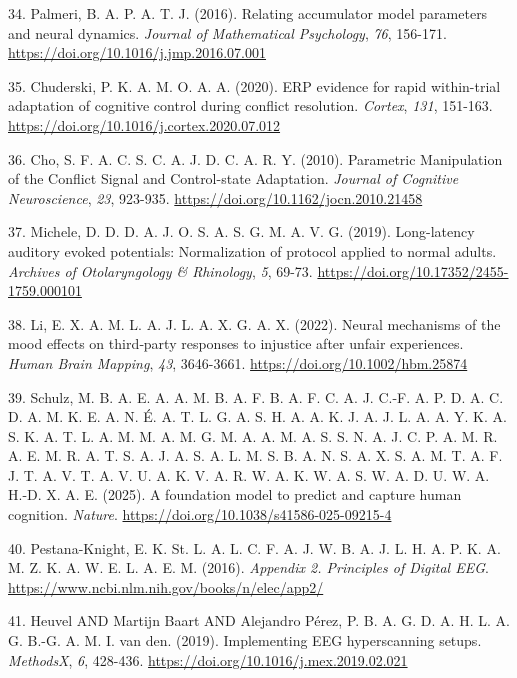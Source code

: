 \documentclass[
  spanish,
  10pt,
]{article}
\newlength{\cslhangindent}
\newenvironment{CSLReferences}[2] %
 {\begin{list}{}{%
  \setlength{\itemindent}{0pt}
  \setlength{\leftmargin}{0pt}
  \setlength{\parsep}{0pt}
  \ifodd #1
   \setlength{\leftmargin}{\cslhangindent}
   \setlength{\itemindent}{-1\cslhangindent}
  \fi
  \setlength{\itemsep}{#2\baselineskip}}}
 {\end{list}}
\begin{document}
\begin{CSLReferences}{1}{0}
34. Palmeri, B. A. P. A. T. J. (2016). Relating accumulator model
parameters and neural dynamics. \emph{Journal of Mathematical
Psychology}, \emph{76}, 156-171.
\url{https://doi.org/10.1016/j.jmp.2016.07.001}

35. Chuderski, P. K. A. M. O. A. A. (2020). ERP evidence for rapid
within-trial adaptation of cognitive control during conflict resolution.
\emph{Cortex}, \emph{131}, 151-163.
\url{https://doi.org/10.1016/j.cortex.2020.07.012}

36. Cho, S. F. A. C. S. C. A. J. D. C. A. R. Y. (2010). Parametric
Manipulation of the Conflict Signal and Control-state Adaptation.
\emph{Journal of Cognitive Neuroscience}, \emph{23}, 923-935.
\url{https://doi.org/10.1162/jocn.2010.21458}

37. Michele, D. D. D. A. J. O. S. A. S. G. M. A. V. G. (2019).
Long-latency auditory evoked potentials: Normalization of protocol
applied to normal adults. \emph{Archives of Otolaryngology \&
Rhinology}, \emph{5}, 69-73.
\url{https://doi.org/10.17352/2455-1759.000101}

38. Li, E. X. A. M. L. A. J. L. A. X. G. A. X. (2022). Neural mechanisms
of the mood effects on third‐party responses to injustice after unfair
experiences. \emph{Human Brain Mapping}, \emph{43}, 3646-3661.
\url{https://doi.org/10.1002/hbm.25874}

39. Schulz, M. B. A. E. A. A. M. B. A. F. B. A. F. C. A. J. C.-F. A. P.
D. A. C. D. A. M. K. E. A. N. É. A. T. L. G. A. S. H. A. A. K. J. A. J.
L. A. A. Y. K. A. S. K. A. T. L. A. M. M. A. M. G. M. A. A. M. A. S. S.
N. A. J. C. P. A. M. R. A. E. M. R. A. T. S. A. J. A. S. A. L. M. S. B.
A. N. S. A. X. S. A. M. T. A. F. J. T. A. V. T. A. V. U. A. K. V. A. R.
W. A. K. W. A. S. W. A. D. U. W. A. H.-D. X. A. E. (2025). A foundation
model to predict and capture human cognition. \emph{Nature}.
\url{https://doi.org/10.1038/s41586-025-09215-4}

40. Pestana-Knight, E. K. St. L. A. L. C. F. A. J. W. B. A. J. L. H. A.
P. K. A. M. Z. K. A. W. E. L. A. E. M. (2016). \emph{Appendix 2.
Principles of Digital EEG}.
\url{https://www.ncbi.nlm.nih.gov/books/n/elec/app2/}

41. Heuvel AND Martijn Baart AND Alejandro Pérez, P. B. A. G. D. A. H.
L. A. G. B.-G. A. M. I. van den. (2019). Implementing EEG hyperscanning
setups. \emph{MethodsX}, \emph{6}, 428-436.
\url{https://doi.org/10.1016/j.mex.2019.02.021}

\end{CSLReferences}
\end{document}
